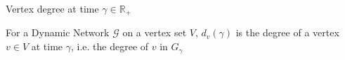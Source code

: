 
\begin{definition}
	Vertex degree at time $\gamma \in \mathbb{R}_+ $ 

	\noindent
	For a Dynamic Network $\mathcal{G}$ on a vertex set $V$, $d_v(\gamma)$ is the degree of a vertex $v \in V$ at time $\gamma$, i.e. the degree of $v$ in $G_\gamma$
\end{definition}




